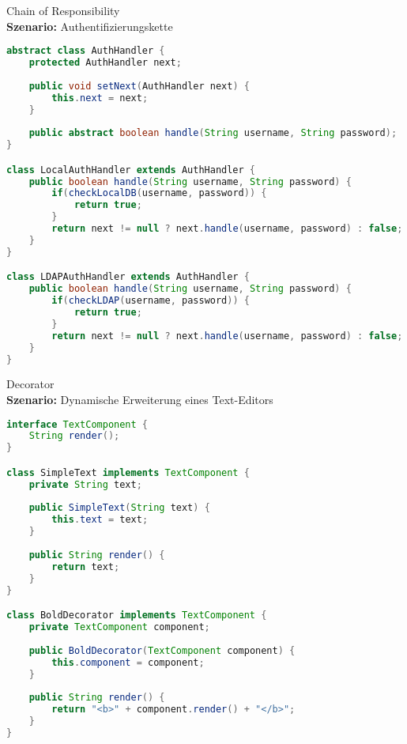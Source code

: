 \begin{example}{Chain of Responsibility}\\
\textbf{Szenario:} Authentifizierungskette
\begin{lstlisting}[language=Java, style=base]
abstract class AuthHandler {
    protected AuthHandler next;
    
    public void setNext(AuthHandler next) {
        this.next = next;
    }
    
    public abstract boolean handle(String username, String password);
}

class LocalAuthHandler extends AuthHandler {
    public boolean handle(String username, String password) {
        if(checkLocalDB(username, password)) {
            return true;
        }
        return next != null ? next.handle(username, password) : false;
    }
}

class LDAPAuthHandler extends AuthHandler {
    public boolean handle(String username, String password) {
        if(checkLDAP(username, password)) {
            return true;
        }
        return next != null ? next.handle(username, password) : false;
    }
}
\end{lstlisting}
\end{example}

\begin{example}{Decorator}\\
\textbf{Szenario:} Dynamische Erweiterung eines Text-Editors
\begin{lstlisting}[language=Java, style=base]
interface TextComponent {
    String render();
}

class SimpleText implements TextComponent {
    private String text;
    
    public SimpleText(String text) {
        this.text = text;
    }
    
    public String render() {
        return text;
    }
}

class BoldDecorator implements TextComponent {
    private TextComponent component;
    
    public BoldDecorator(TextComponent component) {
        this.component = component;
    }
    
    public String render() {
        return "<b>" + component.render() + "</b>";
    }
}
\end{lstlisting}
\end{example}

